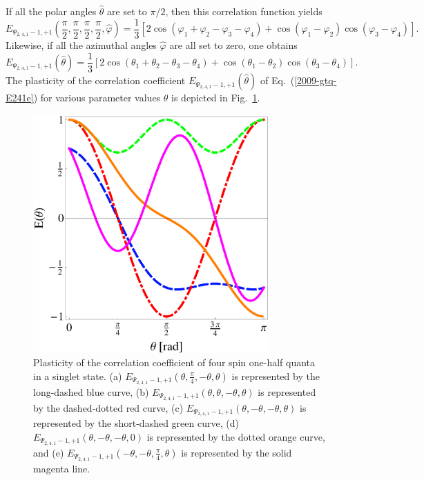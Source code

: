 \documentclass[fleqn,twoside]{article}      %
\begin{document}
If all the polar angles $\hat \theta$ are set to $\pi /2$,
then this correlation function yields
\begin{equation}
E_{{\Psi_{2,4,1}}-1,+1} ( \frac{\pi}{2},\frac{\pi}{2},\frac{\pi}{2},\frac{\pi}{2},\hat \varphi )=
\frac{1}{3} \left[2 \cos (\varphi_1+\varphi_2- \varphi_3 - \varphi_4)
+\cos (\varphi_1-\varphi_2) \cos (\varphi_3-\varphi_4)
\right]
.
\end{equation}
Likewise, if all the azimuthal angles $\hat \varphi$ are all set to zero, one obtains
\begin{equation}
E_{{\Psi_{2,4,1}}-1,+1} (\hat \theta )=
\frac{1}{3} \left[2 \cos (\theta_1+\theta_2- \theta_3 - \theta_4)
+\cos (\theta_1-\theta_2) \cos (\theta_3-\theta_4)
\right]
.
\label{2009-gtq-E241e}
\end{equation}
The plasticity of the correlation coefficient
$E_{{\Psi_{2,4,1}}-1,+1} (\hat \theta )$ of Eq.~(\ref{2009-gtq-E241e})
for various parameter values $\theta$ is depicted in Fig.~\ref{2009-gtq-E241}.
\begin{figure}[htbp]
  \centering
\includegraphics[width=90mm]{2009-gtq-E241}
\caption{Plasticity of the correlation coefficient of four spin one-half quanta in a singlet state.
(a) $E_{{\Psi_{2,4,1}}-1,+1}(\theta , \frac{\pi}{4}, -\theta , \theta )$ is represented by the long-dashed blue curve,
(b) $E_{{\Psi_{2,4,1}}-1,+1}(\theta , \theta , -\theta , \theta )$ is represented by the dashed-dotted red curve,
(c) $E_{{\Psi_{2,4,1}}-1,+1}(\theta , -\theta , -\theta , \theta )$ is represented by the short-dashed green curve,
(d) $E_{{\Psi_{2,4,1}}-1,+1}(\theta , -\theta , -\theta , 0)$ is represented by the dotted orange curve,
and
(e) $E_{{\Psi_{2,4,1}}-1,+1}(-\theta , -\theta , \frac{\pi}{4}, \theta )$ is represented by the solid magenta line.
}
\label{2009-gtq-E241}
\end{figure}
\end{document}
